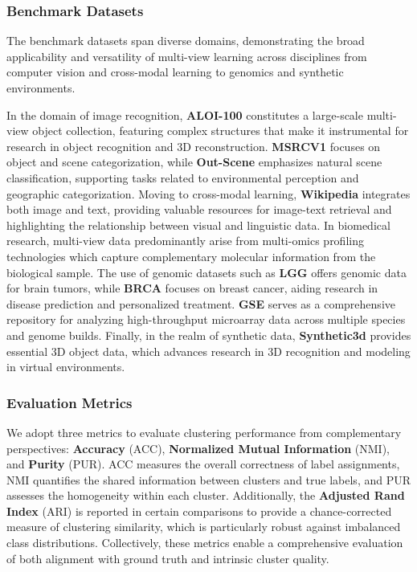 \documentclass[10pt, journal, compsoc]{IEEEtran}
\begin{document}
\subsubsection{Benchmark Datasets}
The benchmark datasets span diverse domains, demonstrating the broad applicability and versatility of multi-view learning across disciplines from computer vision and cross-modal learning to genomics and synthetic environments.

In the domain of image recognition, \textbf{ALOI-100} constitutes a large-scale multi-view object collection, featuring complex structures that make it instrumental for research in object recognition and 3D reconstruction. \textbf{MSRCV1} focuses on object and scene categorization, while \textbf{Out-Scene} emphasizes natural scene classification, supporting tasks related to environmental perception and geographic categorization. Moving to cross-modal learning, \textbf{Wikipedia} integrates both image and text, providing valuable resources for image-text retrieval and highlighting the relationship between visual and linguistic data. In biomedical research, multi-view data predominantly arise from multi-omics profiling technologies which capture complementary molecular information from the biological sample. The use of genomic datasets such as \textbf{LGG} offers genomic data for brain tumors, while \textbf{BRCA} focuses on breast cancer, aiding research in disease prediction and personalized treatment. \textbf{GSE} serves as a comprehensive repository for analyzing high-throughput microarray data across multiple species and genome builds. Finally, in the realm of synthetic data, \textbf{Synthetic3d} provides essential 3D object data, which advances research in 3D recognition and modeling in virtual environments.


\subsubsection{Evaluation Metrics}
We adopt three metrics to evaluate clustering performance from complementary perspectives: \textbf{Accuracy} (ACC), \textbf{Normalized Mutual Information} (NMI), and \textbf{Purity} (PUR). ACC measures the overall correctness of label assignments, NMI quantifies the shared information between clusters and true labels, and PUR assesses the homogeneity within each cluster. Additionally, the \textbf{Adjusted Rand Index} (ARI) is reported in certain comparisons to provide a chance-corrected measure of clustering similarity, which is particularly robust against imbalanced class distributions. Collectively, these metrics enable a comprehensive evaluation of both alignment with ground truth and intrinsic cluster quality.
\end{document}
